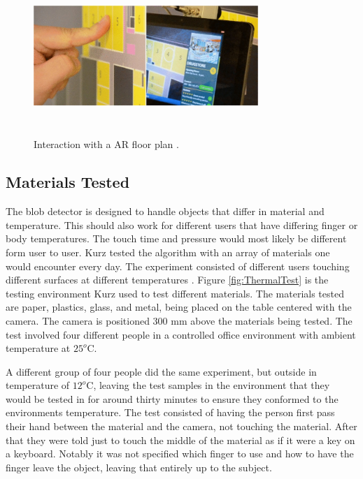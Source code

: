 \documentclass{sig-alternate}
\begin{document}
\begin{figure}
	\includegraphics[width=8.5cm, height=6cm]{AugmentedFloorPlans}
	\caption{Interaction with a AR floor plan \cite{Thermal}.}
	\label{fig:FloorPlan}
\end{figure}

\subsection{Materials Tested}
\label{Materials Tested}
The blob detector is designed to handle objects that differ in material and temperature. This should also work for different users that have differing finger or body temperatures. The touch time and pressure would most likely be different form user to user. Kurz tested the algorithm with an array of materials one would encounter every day. The experiment consisted of different users touching different surfaces at different temperatures \cite{3D}. Figure \ref{fig:ThermalTest} is the testing environment Kurz used to test different materials. The materials tested are paper, plastics, glass, and metal, being placed on the table centered with the camera. The camera is positioned 300 mm above the materials being tested. The test involved four different people in a controlled office environment with ambient temperature at \(25^o\)C. 

A different group of four people did the same experiment, but outside in temperature of \(12^o\)C, leaving the test samples in the environment that they would be tested in for around thirty minutes to ensure they conformed to the environments temperature. The test consisted of having the person first pass their hand between the material and the camera, not touching the material. After that they were told just to touch the middle of the material as if it were a key on a keyboard. Notably it was not specified which finger to use and how to have the finger leave the object, leaving that entirely up to the subject. 
\end{document}
